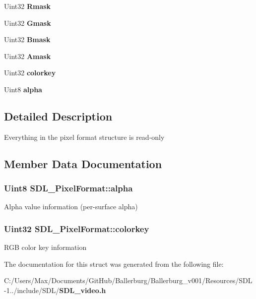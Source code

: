 \begin{DoxyCompactItemize}
\item 
Uint32 {\bfseries Rmask}\label{struct_s_d_l___pixel_format_a35e5793f6e9c356aec2d130167174946}

\item 
Uint32 {\bfseries Gmask}\label{struct_s_d_l___pixel_format_a3d07a81b430202c6ea0089d8df8f4e15}

\item 
Uint32 {\bfseries Bmask}\label{struct_s_d_l___pixel_format_ad366812df3ae62edb9ae6cb89234fddb}

\item 
Uint32 {\bfseries Amask}\label{struct_s_d_l___pixel_format_a6cdaf31f6cb153fefda47fa6b8368c0e}

\item 
Uint32 {\bf colorkey}
\item 
Uint8 {\bf alpha}
\end{DoxyCompactItemize}


\subsection{Detailed Description}
Everything in the pixel format structure is read-\/only 

\subsection{Member Data Documentation}
\subsubsection[{alpha}]{\setlength{\rightskip}{0pt plus 5cm}Uint8 S\+D\+L\+\_\+\+Pixel\+Format\+::alpha}\label{struct_s_d_l___pixel_format_a0b0fd9deaec730811212ecdeaa24c7ea}
Alpha value information (per-\/surface alpha) 
\subsubsection[{colorkey}]{\setlength{\rightskip}{0pt plus 5cm}Uint32 S\+D\+L\+\_\+\+Pixel\+Format\+::colorkey}\label{struct_s_d_l___pixel_format_a1413d87ed860296a49f8b2d8fd8ad778}
R\+G\+B color key information 

The documentation for this struct was generated from the following file\+:\begin{DoxyCompactItemize}
\item 
C\+:/\+Users/\+Max/\+Documents/\+Git\+Hub/\+Ballerburg/\+Ballerburg\+\_\+v001/\+Resources/\+S\+D\+L-\/1../include/\+S\+D\+L/{\bf S\+D\+L\+\_\+video.\+h}\end{DoxyCompactItemize}

